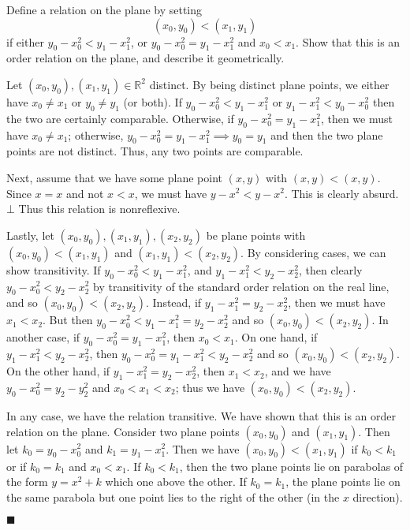 \documentclass[12pt]{article}
\renewcommand{\qed}{\hfill$\blacksquare$}
\renewenvironment{proof}{\begin{addmargin}[1em]{0em}\begin{newproof}}{\end{newproof}\end{addmargin}\qed}
\newenvironment{problem}[2][Exercise]{\begin{trivlist}
\item[\hskip \labelsep {\bfseries #1}\hskip \labelsep {\bfseries #2.}]}{\end{trivlist}}
\begin{document}
\begin{problem}{1.3.6}
Define a relation on the plane by setting \[ \left(x_0,y_0\right) < \left(x_1, y_1\right) \] if either $y_0-x_0^2 < y_1 - x_1^2$, or $y_0 - x_0^2 = y_1 - x_1^2$ and $x_0 < x_1$. Show that this is an order relation on the plane, and describe it geometrically.
\end{problem}
\begin{proof}
Let $\left(x_0,y_0\right), \left(x_1,y_1\right) \in \mathbb{R}^2$ distinct. By being distinct plane points, we either have $x_0 \neq x_1$ or $y_0 \neq y_1$ (or both). If $y_0 - x_0^2 < y_1 - x_1^2$ or $y_1 - x_1^2 < y_0 - x_0^2$ then the two are certainly comparable. Otherwise, if $y_0-x_0^2 = y_1-x_1^2$, then we must have $x_0 \neq x_1$; otherwise, $y_0 - x_0^2 = y_1 - x_1^2 \implies y_0 = y_1$ and then the two plane points are not distinct. Thus, any two points are comparable.

Next, assume that we have some plane point $\left(x,y\right)$ with $\left(x,y\right) < \left(x,y\right)$. Since $x = x$ and not $x < x$, we must have $y- x^2 < y-x^2$. This is clearly absurd. $\bot$ Thus this relation is nonreflexive.

Lastly, let $\left(x_0,y_0\right), \left(x_1,y_1\right), \left(x_2,y_2\right)$ be plane points with $\left(x_0,y_0\right) < \left(x_1,y_1\right)$ and $\left(x_1,y_1\right) < \left(x_2,y_2\right)$. By considering cases, we can show transitivity. If $y_0 - x_0^2 < y_1 - x_1^2$, and $y_1 - x_1^2 < y_2 - x_2^2$, then clearly $y_0 - x_0^2 < y_2 - x_2^2$ by transitivity of the standard order relation on the real line, and so $\left(x_0,y_0\right) < \left(x_2,y_2\right)$. Instead, if $y_1 - x_1^2 = y_2-x_2^2$, then we must have $x_1 < x_2$. But then $y_0 - x_0^2 < y_1 - x_1^2 = y_2 - x_2^2$ and so $\left(x_0,y_0\right) < \left(x_2,y_2\right)$. 
In another case, if $y_0 - x_0^2 = y_1 - x_1^2$, then $x_0 < x_1$. On one hand, if $y_1-x_1^2 < y_2 - x_2^2$, then $y_0-x_0^2 = y_1-x_1^2 < y_2 - x_2^2$ and so $\left(x_0,y_0\right) < \left(x_2,y_2\right)$. On the other hand, if $y_1 - x_1^2 = y_2 - x_2^2$, then $x_1 < x_2$, and we have $y_0 - x_0^2 = y_2 - y_2^2$ and $x_0 < x_1 < x_2$; thus we have $\left(x_0, y_0\right) < \left(x_2,y_2\right)$. 

In any case, we have the relation transitive. We have shown that this is an order relation on the plane. Consider two plane points $\left(x_0,y_0\right)$ and $\left(x_1,y_1\right)$. Then let $k_0 = y_0 - x_0^2$ and $k_1 = y_1 - x_1^2$. Then we have $\left(x_0,y_0\right) < \left(x_1,y_1\right)$ if $k_0 < k_1$ or if $k_0 = k_1$ and $x_0 < x_1$. If $k_0 < k_1$, then the two plane points lie on parabolas of the form $y=x^2 +k$ which one above the other. If $k_0 = k_1$, the plane points lie on the same parabola but one point lies to the right of the other (in the $x$ direction).
\end{proof}
\end{document}

